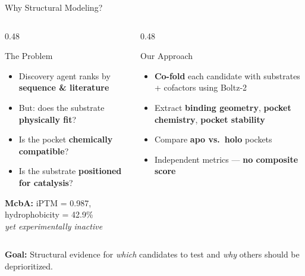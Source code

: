 \documentclass[aspectratio=169, 11pt]{beamer}
\begin{document}
\begin{frame}{Why Structural Modeling?}
\begin{columns}[T]
\begin{column}{0.48\textwidth}
\begin{alertblock}{The Problem}
\begin{itemize}
\item Discovery agent ranks by \textbf{sequence \& literature}
\item But: does the substrate \textbf{physically fit}?
\item Is the pocket \textbf{chemically compatible}?
\item Is the substrate \textbf{positioned for catalysis}?
\end{itemize}
\end{alertblock}
\vspace{4pt}
\colorbox{accentred!15}{\parbox{0.92\textwidth}{\centering\small
\textbf{McbA:} iPTM = 0.987, hydrophobicity = 42.9\%\\
\textit{yet experimentally inactive}
}}
\end{column}
\begin{column}{0.48\textwidth}
\begin{exampleblock}{Our Approach}
\begin{itemize}
\item \textbf{Co-fold} each candidate with substrates + cofactors using Boltz-2
\item Extract \textbf{binding geometry}, \textbf{pocket chemistry}, \textbf{pocket stability}
\item Compare \textbf{apo vs.\ holo} pockets
\item Independent metrics --- \textbf{no composite score}
\end{itemize}
\end{exampleblock}
\end{column}
\end{columns}

\vspace{4pt}
\begin{center}
\colorbox{lightblue!50}{\parbox{0.88\textwidth}{\centering
\small\textbf{Goal:} Structural evidence for \textit{which} candidates to test and \textit{why} others should be deprioritized.
}}
\end{center}
\end{frame}
\end{document}
